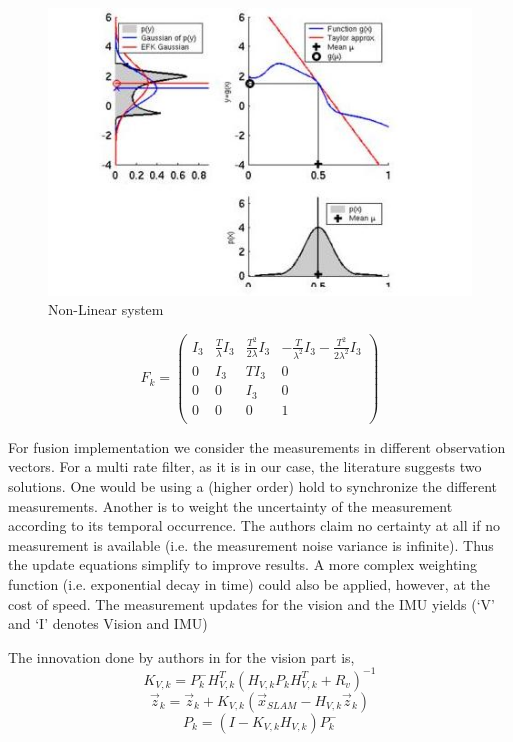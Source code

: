 \begin{figure}[!htb]
\includegraphics[width=\textwidth]{./figures/NonLinear.jpg}
\caption{Non-Linear system~\cite{ByBo2015}}
\end{figure}

\begin{equation}
F_k= 
 \begin{pmatrix}
  I_3 & \frac{T}{\lambda}I_3  & \frac{T^2}{2 \lambda} I_3& -\frac{T}{ \lambda^2} I_3 - \frac{T^2}{ 2 \lambda^2} I_3\\
  0 & I_3 & T I_3 & 0 \\
  0 & 0 & I_3 & 0 \\
  0 & 0 & 0 & 1\\
 \end{pmatrix} 
\end{equation}

For fusion implementation we consider the measurements in different observation
vectors. For a multi rate filter, as it is in our case, the literature suggests two solutions. One would be using a (higher order) hold to synchronize the different measurements. Another is to weight the uncertainty of the measurement according to its temporal occurrence. The authors claim no certainty at all if no
measurement is available (i.e. the measurement noise variance is infinite). Thus the update equations simplify to improve results. A more complex weighting function (i.e. exponential decay in time) could also be applied, however, at the cost of speed. The measurement updates for the vision and the IMU yields (‘V’ and ‘I’ denotes Vision and IMU)

The innovation done by authors in for the vision part is,
\begin{equation}
K_{V,k}=P_k^- H_{V,k}^T (H_{V,k} P_k H_{V,k}^T +R_v)^{-1}
\end{equation}
\begin{equation}
\overrightarrow{z}_{k}=\overrightarrow{z}_{k}+K_{V,k}(\overrightarrow{x}_{SLAM}-H_{V,k} \overrightarrow{z}_{k})
\end{equation}
\begin{equation}
P_k=(I-K_{V,k} H_{V,k}) P_k^-
\end{equation}


